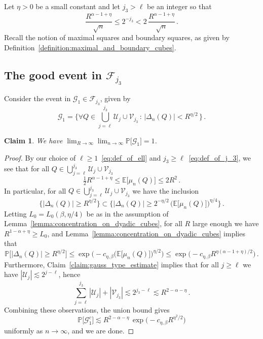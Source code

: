 \documentclass[11pt]{amsart}
\newtheorem{claim}[theorem]{Claim}
\theoremstyle{definition}
\theoremstyle{remark}
\numberwithin{equation}{section}
\newcommand{\bP}{\mathbb P}
\newcommand{\bE}{\mathbb E}
\begin{document}
	Let $\eta>0$ be a small constant and let $j_3>\ell$ be an integer so that
	\begin{equation}
		\label{eq:def_of_j_3}
		\frac{R^{\alpha - 1 + \eta}}{\sqrt{n}} \le 2^{-j_3} < 2 \, \frac{R^{\alpha-1+\eta}}{\sqrt{n}} \, .
	\end{equation}
	Recall the notion of maximal squares and boundary squares, as given by Definition~\ref{definition:maximal_and_boundary_cubes}. 
	\subsection{The good event in \texorpdfstring{$\mathcal{F}_{j_3}$}{Fj3}} Consider the event in $\mathcal{G}_1\in \mathcal{F}_{j_3}$, given by
	\begin{equation}
		\label{eq:def_of_good_event_large_deviations_lower_bound}
		\mathcal{G}_1 = \bigg\{ \forall Q\in \bigcup_{j=\ell}^{j_3} \mathcal{U}_j \cup \mathcal{V}_{j_3} \, : \, |\Delta_{n}(Q)| < R^{\eta/2} \, \bigg\}\, .
	\end{equation}
	\begin{claim}
		\label{claim:large_deviations_lower_bound_good_event_is_likely}
		We have $\displaystyle \lim_{R\to \infty} \lim_{n\to \infty} \bP\big[\mathcal{G}_1\big] = 1$.
	\end{claim}
	\begin{proof}
		By our choice of $\ell\ge 1$~\eqref{eq:def_of_ell} and $j_3\ge \ell$~\eqref{eq:def_of_j_3}, we see that for all $Q\in \bigcup_{j=\ell}^{j_3} \mathcal{U}_j \cup \mathcal{V}_{j_3}$ 
		\[
		\tfrac12 R^{\alpha-1+\eta} \le \bE\big[\mu_n(Q)\big] \le 2 R^2 \, .
		\]
		In particular, for all $Q\in \bigcup_{j=\ell}^{j_3} \mathcal{U}_j \cup \mathcal{V}_{j_3}$ we have the inclusion
		\[
		\Big\{ |\Delta_n(Q)| \ge R^{\eta/2} \Big\} \subset \Big\{ |\Delta_n(Q)| \ge 2^{-\eta/2} \, \big(\bE\big[\mu_n(Q)\big]\big)^{\eta/4} \Big\} \, .
		\]
		Letting $L_0 = L_0(\beta,\eta/4)$ be as in the assumption of Lemma~\ref{lemma:concentration_on_dyadic_cubes}, for all $R$ large enough we have $R^{1-\alpha+\eta} \ge L_0$, and Lemma~\ref{lemma:concentration_on_dyadic_cubes} implies that
		\begin{equation*}
			\bP\Big[ |\Delta_n(Q)| \ge R^{\eta/2}\Big] \le \exp\Big(-c_{\eta,\beta} \big(\bE\big[\mu_n(Q)\big]\big)^{\eta/2} \Big) \le \exp\Big(-c_{\eta,\beta} R^{\eta(\alpha-1+\eta)/2}\Big)\, .
		\end{equation*}
		Furthermore, Claim~\ref{claim:gauss_type_estimate} implies that for all $j\ge \ell$ we have $|\mathcal{U}_{j}| \lesssim 2^{j-\ell}$, hence
		\[
		\sum_{j=\ell}^{j_3} |\mathcal{U}_j| + |\mathcal{V}_{j_3}| \lesssim 2^{j_3 - \ell} \lesssim R^{2-\alpha-\eta} \, .
		\]
		Combining these observations, the union bound gives
		\[
		\bP\big[\mathcal{G}_1^c\big] \lesssim R^{2-\alpha-\eta} \, \exp\Big(-c_{\eta,\beta} R^{\eta^2/2} \Big)
		\]
		uniformly as $n\to \infty$, and we are done.
	\end{proof}
\end{document}
